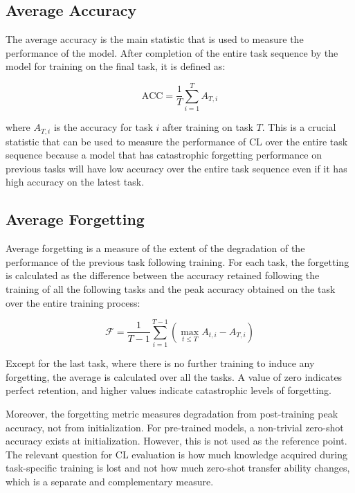 \documentclass[english, LaM, oneside]{sapthesis}%
\numberwithin{equation}{chapter}
\begin{document}
\subsection{Average Accuracy}
The average accuracy is the main statistic that is used to measure the performance of the model. After completion of the entire task sequence by the model for training on the final task, it is defined as:

\begin{equation}
    \text{ACC} = \frac{1}{T} \sum_{i=1}^{T} A_{T,i}
\end{equation}
 
where $A_{T,i}$ is the accuracy for task $i$ after training on task $T$. This is a crucial statistic that can be used to measure the performance of CL over the entire task sequence because a model that has catastrophic forgetting performance on previous tasks will have low accuracy over the entire task sequence even if it has high accuracy on the latest task.

\subsection{Average Forgetting}
Average forgetting is a measure of the extent of the degradation of the performance of the previous task following training. For each task, the forgetting is calculated as the difference between the accuracy retained following the training of all the following tasks and the peak accuracy obtained on the task over the entire training process:

\begin{equation}
    \mathcal{F} = \frac{1}{T-1} \sum_{i=1}^{T-1} \left( \max_{t \leq T} A_{t,i} - A_{T,i} \right)
\end{equation}
 
Except for the last task, where there is no further training to induce any forgetting, the average is calculated over all the tasks. A value of zero indicates perfect retention, and higher values indicate catastrophic levels of forgetting.

Moreover, the forgetting metric measures degradation from post-training peak accuracy, not from initialization. For pre-trained models, a non-trivial zero-shot accuracy exists at initialization. However, this is not used as the reference point. The relevant question for CL evaluation is how much knowledge acquired during task-specific training is lost and not how much zero-shot transfer ability changes, which is a separate and complementary measure.
\end{document}

